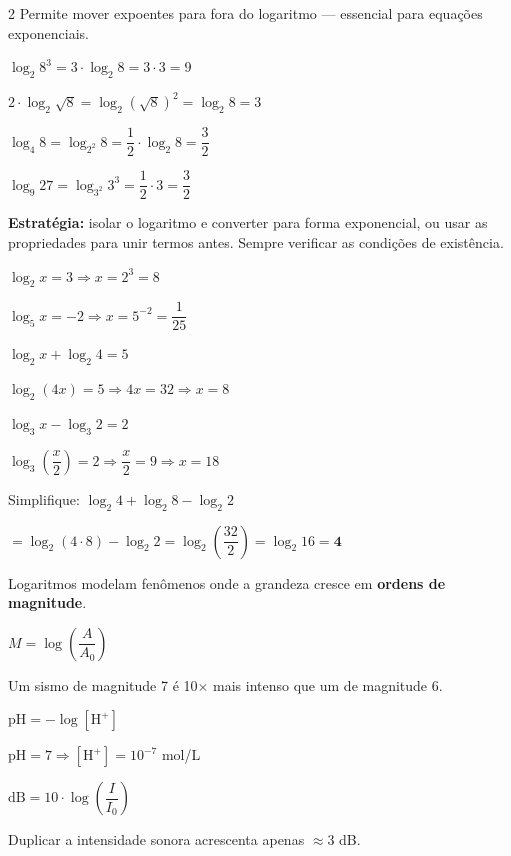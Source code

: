 \documentclass[12pt]{article}
\begin{document}
\begin{multicols}{2}
Permite mover expoentes para fora do logaritmo — essencial para equações exponenciais.

$\log_2 8^3 = 3 \cdot \log_2 8 = 3 \cdot 3 = 9$

$2 \cdot \log_2 \sqrt{8} = \log_2 (\sqrt{8})^2 = \log_2 8 = 3$



$\log_4 8 = \log_{2^2} 8 = \dfrac{1}{2} \cdot \log_2 8 = \dfrac{3}{2}$

$\log_9 27 = \log_{3^2} 3^3 = \dfrac{1}{2} \cdot 3 = \dfrac{3}{2}$


\textbf{Estratégia:} isolar o logaritmo e converter para forma exponencial, ou usar as propriedades para unir termos antes. Sempre verificar as condições de existência.


$\log_2 x = 3 \Rightarrow x = 2^3 = 8$

$\log_5 x = -2 \Rightarrow x = 5^{-2} = \dfrac{1}{25}$


$\log_2 x + \log_2 4 = 5$

$\log_2 (4x) = 5 \Rightarrow 4x = 32 \Rightarrow x = 8$

\vspace{6px}

$\log_3 x - \log_3 2 = 2$

$\log_3 \left(\dfrac{x}{2}\right) = 2 \Rightarrow \dfrac{x}{2} = 9 \Rightarrow x = 18$


Simplifique: $\log_2 4 + \log_2 8 - \log_2 2$

$= \log_2 (4 \cdot 8) - \log_2 2 = \log_2 \left(\dfrac{32}{2}\right) = \log_2 16 = \mathbf{4}$


Logaritmos modelam fenômenos onde a grandeza cresce em \textbf{ordens de magnitude}.


$M = \log\left(\dfrac{A}{A_0}\right)$

Um sismo de magnitude 7 é 10× mais intenso que um de magnitude 6.


$\text{pH} = -\log[\text{H}^+]$

$\text{pH} = 7 \Rightarrow [\text{H}^+] = 10^{-7}$ mol/L


$\text{dB} = 10 \cdot \log\left(\dfrac{I}{I_0}\right)$

Duplicar a intensidade sonora acrescenta apenas $\approx 3$ dB.

\end{multicols}


\end{document}
